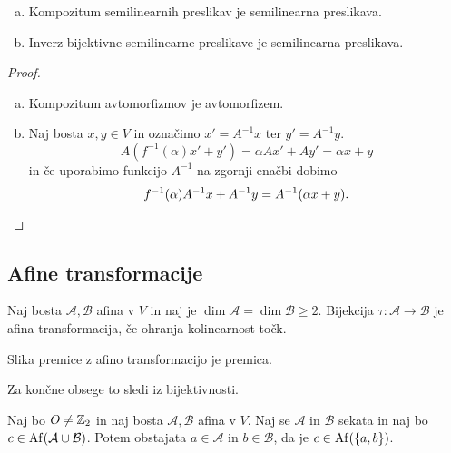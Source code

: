 \begin{trditev}
    \begin{enumerate}[a)]
        \item Kompozitum semilinearnih preslikav je semilinearna preslikava.
        \item Inverz bijektivne semilinearne preslikave je semilinearna preslikava.
    \end{enumerate}
\end{trditev}

\begin{proof}
    \begin{enumerate}[a)]
        \item Kompozitum avtomorfizmov je avtomorfizem.
        \item Naj bosta $x,y \in V$ in označimo $x' = A^{-1}x$ ter $y' = A^{-1}y$.
        \[
            A(f^{-1}(\alpha)x' + y') = \alpha Ax' + Ay' = \alpha x + y    
        \]
        in če uporabimo funkcijo $A^{-1}$ na zgornji enačbi dobimo
        \[
            f^{-1}(\alpha)A^{-1}x + A^{-1}y = A^{-1}(\alpha x + y). \qedhere
        \]
    \end{enumerate}
\end{proof}

\subsection{Afine transformacije}

\begin{definicija}
    Naj bosta $\mathcal{A}, \mathcal{B}$ afina v $V$ in naj je $\dim \mathcal{A} = \dim \mathcal{B} \geq 2$. Bijekcija $\tau \colon \mathcal{A} \to \mathcal{B}$ je afina transformacija, če ohranja kolinearnost točk.
\end{definicija}

\begin{izrek}
    Slika premice z afino transformacijo je premica.
\end{izrek}

\begin{opomba}
    Za končne obsege to sledi iz bijektivnosti.
\end{opomba}

\begin{lema*}
    Naj bo $O \neq \mathbb{Z}_2$ in naj bosta $\mathcal{A}, \mathcal{B}$ afina v $V$. Naj se $\mathcal{A}$ in $\mathcal{B}$ sekata in naj bo $c \in \operatorname{Af} (\mathcal{A} \cup \mathcal{B})$. Potem obstajata $a \in \mathcal{A}$ in $b \in \mathcal{B}$,
    da je $c \in \operatorname{Af} (\left\{a,b\right\})$.
\end{lema*}

